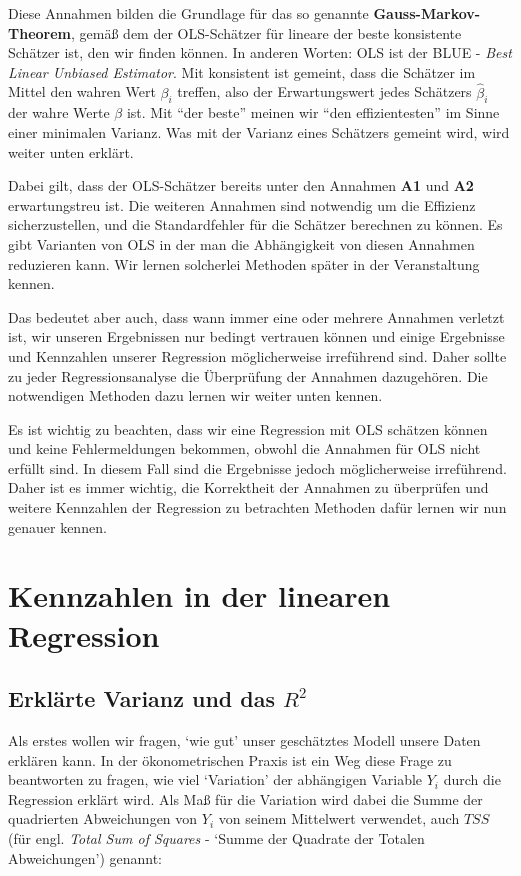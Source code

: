 \documentclass[]{book}
\begin{document}
Diese Annahmen bilden die Grundlage für das so genannte
\textbf{Gauss-Markov-Theorem}, gemäß dem der OLS-Schätzer für lineare
der beste konsistente Schätzer ist, den wir finden können. In anderen
Worten: OLS ist der BLUE - \emph{Best Linear Unbiased Estimator}. Mit
konsistent ist gemeint, dass die Schätzer im Mittel den wahren Wert
\(\beta_i\) treffen, also der Erwartungswert jedes Schätzers
\(\hat{\beta}_i\) der wahre Werte \(\beta\) ist. Mit ``der beste''
meinen wir ``den effizientesten'' im Sinne einer minimalen Varianz. Was
mit der Varianz eines Schätzers gemeint wird, wird weiter unten erklärt.

Dabei gilt, dass der OLS-Schätzer bereits unter den Annahmen \textbf{A1}
und \textbf{A2} erwartungstreu ist. Die weiteren Annahmen sind notwendig
um die Effizienz sicherzustellen, und die Standardfehler für die
Schätzer berechnen zu können. Es gibt Varianten von OLS in der man die
Abhängigkeit von diesen Annahmen reduzieren kann. Wir lernen solcherlei
Methoden später in der Veranstaltung kennen.

Das bedeutet aber auch, dass wann immer eine oder mehrere Annahmen
verletzt ist, wir unseren Ergebnissen nur bedingt vertrauen können und
einige Ergebnisse und Kennzahlen unserer Regression möglicherweise
irreführend sind. Daher sollte zu jeder Regressionsanalyse die
Überprüfung der Annahmen dazugehören. Die notwendigen Methoden dazu
lernen wir weiter unten kennen.

Es ist wichtig zu beachten, dass wir eine Regression mit OLS schätzen
können und keine Fehlermeldungen bekommen, obwohl die Annahmen für OLS
nicht erfüllt sind. In diesem Fall sind die Ergebnisse jedoch
möglicherweise irreführend. Daher ist es immer wichtig, die Korrektheit
der Annahmen zu überprüfen und weitere Kennzahlen der Regression zu
betrachten Methoden dafür lernen wir nun genauer kennen.

\hypertarget{lin-kennzahlen}{\section{Kennzahlen in der linearen
Regression}\label{lin-kennzahlen}}

\subsection{\texorpdfstring{Erklärte Varianz und das
\(R^2\)}{Erklärte Varianz und das R\^{}2}}\label{erklarte-varianz-und-das-r2}

Als erstes wollen wir fragen, `wie gut' unser geschätztes Modell unsere
Daten erklären kann. In der ökonometrischen Praxis ist ein Weg diese
Frage zu beantworten zu fragen, wie viel `Variation' der abhängigen
Variable \(Y_i\) durch die Regression erklärt wird. Als Maß für die
Variation wird dabei die Summe der quadrierten Abweichungen von \(Y_i\)
von seinem Mittelwert verwendet, auch \(TSS\) (für engl. \emph{Total Sum
of Squares} - `Summe der Quadrate der Totalen Abweichungen') genannt:
\end{document}
